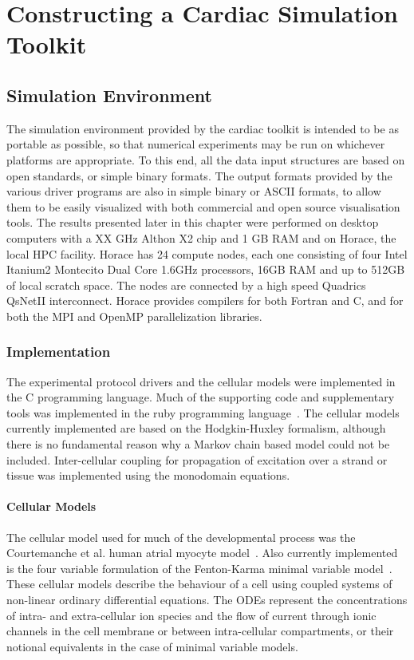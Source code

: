 \chapter{Constructing a Cardiac Simulation Toolkit}

\section{Simulation Environment}

The simulation environment provided by the cardiac toolkit is intended to be as
portable as possible, so that numerical experiments may be run on whichever
platforms are appropriate.  To this end, all the data input structures are based
on open standards, or simple binary formats.  The output formats provided by the
various driver programs are also in simple binary or ASCII formats, to allow
them to be easily visualized with both commercial and open source visualisation
tools.  The results presented later in this chapter were performed on desktop
computers with a XX GHz Althon X2 chip and 1 GB RAM and on Horace, the local HPC
facility.  Horace has 24 compute nodes, each one consisting of four Intel Itanium2
Montecito Dual Core 1.6GHz processors, 16GB RAM and up to 512GB of local scratch
space.  The nodes are connected by a high speed Quadrics QsNetII
interconnect.  Horace provides compilers for both Fortran and C,
and for both the MPI and OpenMP parallelization libraries.

\subsection{Implementation}

The experimental protocol drivers and the cellular models were implemented in
the C programming language.
Much of the supporting code and supplementary tools was implemented in the ruby
programming language~\cite{Flanagan2008}.
The cellular models currently implemented are based on the Hodgkin-Huxley
formalism, although there is no fundamental reason why a Markov chain based
model could not be included.
Inter-cellular coupling for propagation of excitation over a strand or tissue
was implemented using the monodomain equations.

\subsubsection{Cellular Models}

The cellular model used for much of the developmental process was the
Courtemanche et al. human atrial myocyte model~\cite{CRN98}.
Also currently implemented is the four variable formulation of the Fenton-Karma
minimal variable model~\cite{Bueno-Orovio2008}.
These cellular models describe the behaviour of a cell using coupled systems of
non-linear ordinary differential equations.
The ODEs represent the concentrations of intra- and extra-cellular ion species
and the flow of current through ionic channels in the cell membrane or between
intra-cellular compartments, or their notional equivalents in the case of
minimal variable models.

